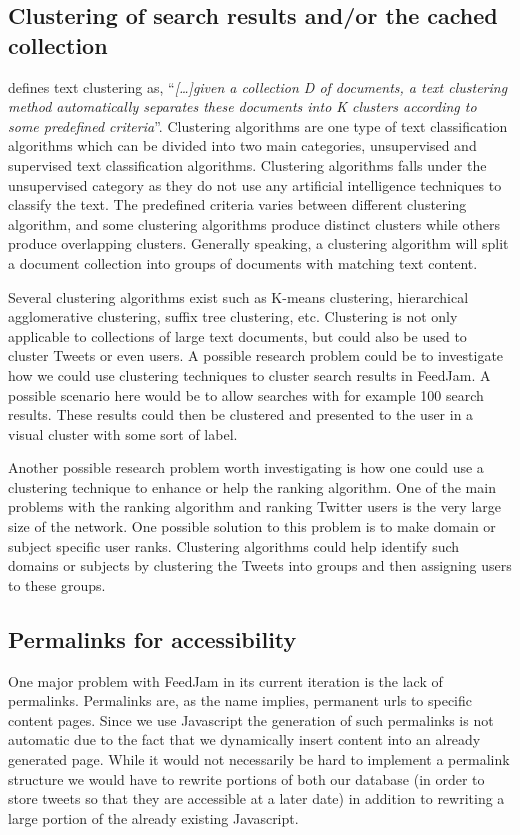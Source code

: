 \subsection{Clustering of search results and/or the cached collection} %
\citet[pg. 286]{Baeza-Yates2010b} defines text clustering as, ``\textit{[\dots]given a collection D of documents, a text clustering method automatically separates these documents into K clusters according to some predefined criteria}''. Clustering algorithms are one type of text classification algorithms which can be divided into two main categories, unsupervised and supervised text classification algorithms. Clustering algorithms falls under the unsupervised category as they do not use any artificial intelligence techniques to classify the text. The predefined criteria varies between different clustering algorithm, and some clustering algorithms produce distinct clusters while others produce overlapping clusters. Generally speaking, a clustering algorithm will split a document collection into groups of documents with matching text content.

Several clustering algorithms exist such as K-means clustering, hierarchical agglomerative clustering, suffix tree clustering, etc. \cite{Baeza-Yates2010b} Clustering is not only applicable to collections of large text documents, but could also be used to cluster Tweets or even users. A possible research problem could be to investigate how we could use clustering techniques to cluster search results in FeedJam. A possible scenario here would be to allow searches with for example 100 search results. These results could then be clustered and presented to the user in a visual cluster with some sort of label.

Another possible research problem worth investigating is how one could use a clustering technique to enhance or help the ranking algorithm. One of the main problems with the ranking algorithm and ranking Twitter users is the very large size of the network. One possible solution to this problem is to make domain or subject specific user ranks. Clustering algorithms could help identify such domains or subjects by clustering the Tweets into groups and then assigning users to these groups.

\subsection{Permalinks for accessibility}
One major problem with FeedJam in its current iteration is the lack of permalinks. Permalinks are, as the name implies, permanent urls to specific content pages. Since we use Javascript the generation of such permalinks is not automatic due to the fact that we dynamically insert content into an already generated page. While it would not necessarily be hard to implement a permalink structure we would have to rewrite portions of both our database (in order to store tweets so that they are accessible at a later date) in addition to rewriting a large portion of the already existing Javascript.